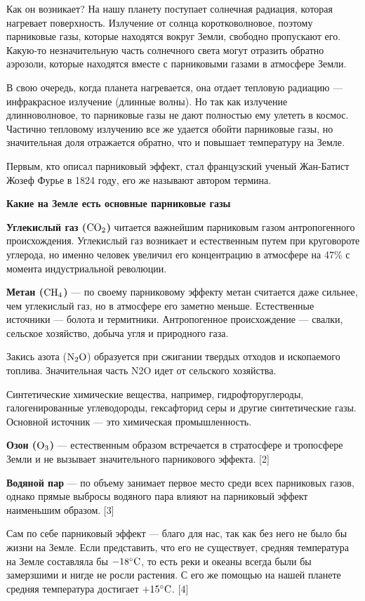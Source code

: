 Как он возникает? На нашу планету поступает солнечная радиация, которая нагревает поверхность. Излучение от солнца коротковолновое, поэтому парниковые газы, которые находятся вокруг Земли, свободно пропускают его. Какую-то незначительную часть солнечного света могут отразить обратно аэрозоли, которые находятся вместе с парниковыми газами в атмосфере Земли.

В свою очередь, когда планета нагревается, она отдает тепловую радиацию — инфракрасное излучение (длинные волны). Но так как излучение длинноволновое, то парниковые газы не дают полностью ему улететь в космос. Частично тепловому излучению все же удается обойти парниковые газы, но значительная доля отражается обратно, что и повышает температуру на Земле.

Первым, кто описал парниковый эффект, стал французский ученый Жан-Батист Жозеф Фурье в 1824 году, его же называют автором термина.


\textbf{Какие на Земле есть основные парниковые газы}

\textbf{Углекислый газ ($\rm{CO}_2$)}
читается важнейшим парниковым газом антропогенного происхождения. Углекислый газ возникает и естественным путем при круговороте углерода, но именно человек увеличил его концентрацию в атмосфере на 47\% с момента индустриальной революции.

\textbf{Метан ($\rm{CH}_4$)} — по своему парниковому эффекту метан считается даже сильнее, чем углекислый газ, но в атмосфере его заметно меньше. Естественные источники — болота и термитники. Антропогенное происхождение — свалки, сельское хозяйство, добыча угля и природного газа.

Закись азота ($\rm{N}_2\rm{O}$) образуется при сжигании твердых отходов и ископаемого топлива. Значительная часть N2O идет от сельского хозяйства.

Синтетические химические вещества, например, гидрофторуглероды, галогенированные углеводороды, гексафторид серы и другие синтетические газы. Основной источник — это химическая промышленность.

\textbf{Озон ($\rm{O}_3$)} — естественным образом встречается в стратосфере и тропосфере Земли и не вызывает значительного парникового эффекта. [2]

\textbf{Водяной пар} — по объему занимает первое место среди всех парниковых газов, однако прямые выбросы водяного пара влияют на парниковый эффект наименьшим образом. [3]

Сам по себе парниковый эффект — благо для нас, так как без него не было бы жизни на Земле. Если представить, что его не существует, средняя температура на Земле составляла бы $-18^\circ\rm{C}$, то есть реки и океаны всегда были бы замерзшими и нигде не росли растения. С его же помощью на нашей планете средняя температура достигает $+15^\circ\rm{C}$. [4]

